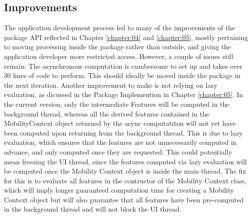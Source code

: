 \subsection{Improvements}
The application development process led to many of the improvements of the package API reflected in Chapter \ref{chapter:04} and \ref{chapter:05}, mostly pertaining to moving processing inside the package rather than outside, and giving the application developer more restricted access. However, a couple of issues still remain: The asynchronous computation is cumbersome to set up and takes over 30 lines of code to perform. This should ideally be moved inside the package in the next iteration. Another improvement to make is not relying on lazy evaluation, as dicussed in the Package Implemention in Chapter \ref{chapter:05}. In the current version, only the intermediate Features will be computed in the background thread, whereas all the derived features contained in the MobilityContext object returned by the async computatiton will not yet have been computed upon returning from the background thread. This is due to lazy evaluation, which ensures that the features are not unnecessarily computed in advance, and only computed once they are requested. This could potentially mean freezing the UI thread, since the features computed via lazy evaluation will be computed once the Mobility Context object is inside the main thread. The fix for this is to evaluate all features in the contructor of the Mobility Context class, which will imply longer guaranteed computation time for creating a Mobility Context object but will also guarantee that all features have been pre-computed in the background thread and will not block the UI thread.